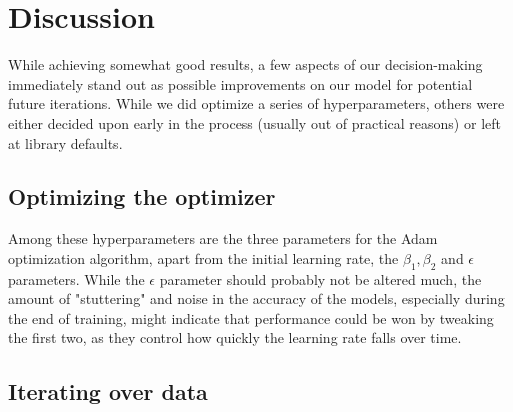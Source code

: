 \section{Discussion}
While achieving somewhat good results, a few aspects of our decision-making immediately stand out as possible improvements on our model for potential future iterations. While we did optimize a series of hyperparameters, others were either decided upon early in the process (usually out of practical reasons) or left at library defaults.
\subsection{Optimizing the optimizer}
Among these hyperparameters are the three parameters for the Adam optimization algorithm, apart from the initial learning rate, the $\beta_1, \beta_2$ and $\epsilon$ parameters. While the $\epsilon$ parameter should probably not be altered much, the amount of "stuttering" and noise in the accuracy of the models, especially during the end of training, might indicate that performance could be won by tweaking the first two, as they control how quickly the learning rate falls over time.
\subsection{Iterating over data}
